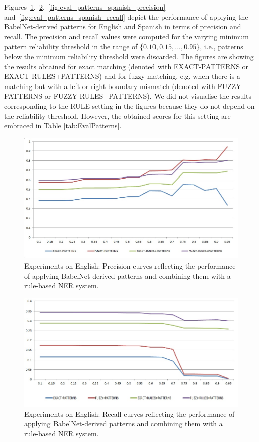 \documentclass[output=paper]{langsci/langscibook}
\begin{document}
Figures~\ref{fig:eval_patterns_english_precision},~\ref{fig:eval_patterns_english_recall},~\ref{fig:eval_patterns_spanish_precision}
and~\ref{fig:eval_patterns_spanish_recall} depict the performance of applying the BabelNet-derived patterns for English and Spanish 
in terms of precision and recall. The precision and recall values were computed for the varying minimum pattern reliability threshold in the range of $\{0.10,0.15,...,0.95\}$, i.e., patterns below the minimum reliability threshold were discarded.
The figures are showing the results obtained for exact matching (denoted with EXACT-PATTERNS or EXACT-RULES+PATTERNS) and for fuzzy matching, e.g. when there is a matching but with a left or right boundary mismatch (denoted with FUZZY-PATTERNS or FUZZY-RULES+PATTERNS).
We did not visualise the results corresponding to the RULE setting in the figures because they do not depend on the reliability threshold. However, the obtained scores for this setting are embraced in Table \ref{tab:EvalPatterns}.

\begin{figure}
\centering
\includegraphics[width=.95\textwidth]{figures/eval_patterns_English_precision.jpg}
\caption{Experiments on English: Precision curves reflecting the performance of applying BabelNet-derived patterns and combining them with a rule-based NER system. }
\label{fig:eval_patterns_english_precision}
\end{figure}

\begin{figure}
\centering
\includegraphics[width=.95\textwidth]{figures/eval_patterns_English_recall.jpg}
\caption{Experiments on English: Recall curves reflecting the performance of applying BabelNet-derived patterns and combining them with a rule-based NER system.}
\label{fig:eval_patterns_english_recall}
\end{figure}
\end{document}
